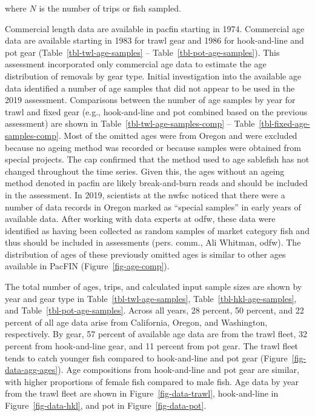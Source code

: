 \documentclass[
  english,
]{article}
\begin{document}
where \(N\) is the number of trips or fish sampled.

Commercial length data are available in \gls{pacfin} starting in 1974.
Commercial age data are available starting in 1983 for trawl gear and
1986 for hook-and-line and pot gear (Table~\ref{tbl-twl-age-samples} --
Table~\ref{tbl-pot-age-samples}). This assessment incorporated only
commercial age data to estimate the age distribution of removals by gear
type. Initial investigation into the available age data identified a
number of age samples that did not appear to be used in the 2019
assessment. Comparisons between the number of age samples by year for
trawl and fixed gear (e.g., hook-and-line and pot combined based on the
previous assessment) are shown in Table~\ref{tbl-twl-age-samples-comp}
-- Table~\ref{tbl-fixed-age-samples-comp}. Most of the omitted ages were
from Oregon and were excluded because no ageing method was recorded or
because samples were obtained from special projects. The \gls{cap}
confirmed that the method used to age sablefish has not changed
throughout the time series. Given this, the ages without an ageing
method denoted in \gls{pacfin} are likely break-and-burn reads and
should be included in the assessment. In 2019, scientists at the
\gls{nwfsc} noticed that there were a number of data records in Oregon
marked as ``special samples'' in early years of available data. After
working with data experts at \gls{odfw}, these data were identified as
having been collected as random samples of market category fish and thus
should be included in assessments (pers. comm., Ali Whitman,
\gls{odfw}). The distribution of ages of these previously omitted ages
is similar to other ages available in PacFIN
(Figure~\ref{fig-age-comp}).

The total number of ages, trips, and calculated input sample sizes are
shown by year and gear type in Table~\ref{tbl-twl-age-samples},
Table~\ref{tbl-hkl-age-samples}, and Table~\ref{tbl-pot-age-samples}.
Across all years, 28 percent, 50 percent, and 22 percent of all age data
arise from California, Oregon, and Washington, respectively. By gear, 57
percent of available age data are from the trawl fleet, 32 percent from
hook-and-line gear, and 11 percent from pot gear. The trawl fleet tends
to catch younger fish compared to hook-and-line and pot gear
(Figure~\ref{fig-data-agg-ages}). Age compositions from hook-and-line
and pot gear are similar, with higher proportions of female fish
compared to male fish. Age data by year from the trawl fleet are shown
in Figure~\ref{fig-data-trawl}, hook-and-line in
Figure~\ref{fig-data-hkl}, and pot in Figure~\ref{fig-data-pot}.
\end{document}
